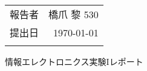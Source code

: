 \documentclass{jsarticle}
\title{}
\author{}
\date{}
\begin{document}
  \maketitle
  \begin{table}[b]
    \centering
    \begin{tabular}{:c:r:}
      \hdashline
      報告者 & 橋爪 黎  530 \\
      \hdashline
      提出日 & \today \\
      \hdashline
    \end{tabular}
  \end{table}

  \newpage

  \centerline{\Large 情報エレクトロニクス実験Iレポート}

  
\end{document}

